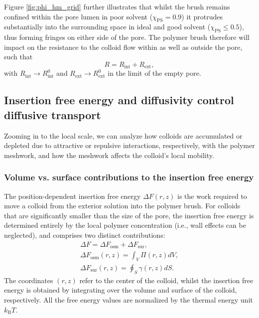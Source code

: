 \documentclass[12pt, a4paper]{article}
\begin{document}
Figure \ref{fig:phi_hm_grid} further illustrates that whilst the brush remains confined within the pore lumen in poor solvent ($\chi_{\text{PS}}=0.9$) it protrudes substantially into the surrounding space in ideal and good solvent ($\chi_{\text{PS}}\le0.5$), thus forming fringes on either side of the pore.
The polymer brush therefore will impact on the resistance to the colloid flow within as well as outside the pore, such that
\begin{equation}
    R=R_{\text{int}}+R_{\text{ext}},
    \label{eq:R_tot_tot}
\end{equation}
with $R_{\text{int}}\rightarrow R_{\text{int}}^{0}$ and $R_{\text{ext}}\rightarrow R_{\text{ext}}^{0}$ in the limit of the empty pore.


\subsection{Insertion free energy and diffusivity control diffusive transport}

Zooming in to the local scale, we can analyze how colloids are accumulated or depleted due to attractive or repulsive interactions, respectively, with the polymer meshwork, and how the meshwork affects the colloid's local mobility.


\subsubsection{Volume vs. surface contributions to the insertion free energy}

The position-dependent insertion free energy $\Delta F(r,z)$ is the work required to move a colloid from the exterior solution into the polymer brush.
For colloids that are significantly smaller than the size of the pore, the insertion free energy is determined entirely by the local polymer concentration (i.e., wall effects can be neglected), and comprises two distinct contributions:
\begin{eqnarray}
    \Delta F = \Delta F_{\text{osm}} + \Delta F_{\text{sur}},
    \label{eq:Delta_F}
    \\
    \Delta F_{\text{osm}}(r,z) = \int_{V} \Pi(r,z) dV, \nonumber
    \\
    \Delta F_{\text{sur}}(r,z) = \oint_{S} \gamma (r,z) dS. \nonumber
\end{eqnarray}
The coordinates $(r,z)$ refer to the center of the colloid, whilst the insertion free energy is obtained by integrating over the volume and surface of the colloid, respectively. All the free energy values are normalized by the thermal energy unit $k_{\text{B}}T$.
\end{document}
